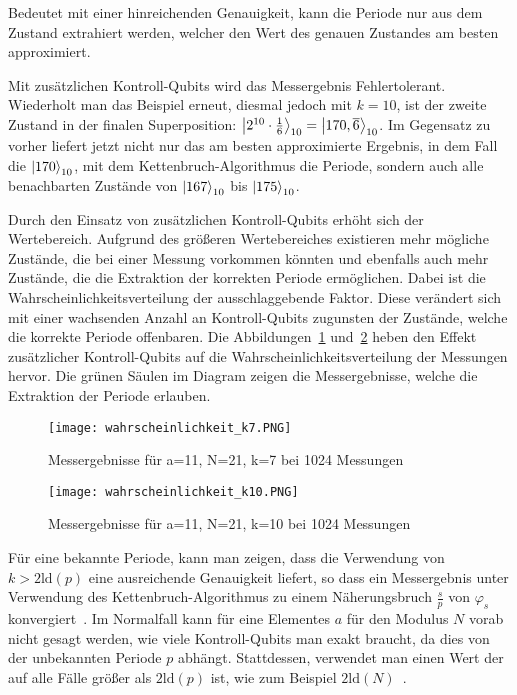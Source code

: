 Bedeutet mit einer hinreichenden Genauigkeit, kann die Periode nur aus dem Zustand extrahiert werden, 
welcher den Wert des genauen Zustandes am besten approximiert.

Mit zusätzlichen Kontroll-Qubits wird das Messergebnis Fehlertolerant.
Wiederholt man das Beispiel erneut, diesmal jedoch mit \(k=10\), 
ist der zweite Zustand in der finalen Superposition: 
\(\ket{2^{10} \cdot \frac{1}{6}}_{10} =\ket{170,\overline{6}}_{10}\).
Im Gegensatz zu vorher liefert jetzt nicht nur das am besten approximierte Ergebnis, 
in dem Fall die \(\ket{170}_{10}\), mit dem Kettenbruch-Algorithmus die Periode, 
sondern auch alle benachbarten Zustände von \(\ket{167}_{10}\) bis \(\ket{175}_{10}\).

Durch den Einsatz von zusätzlichen Kontroll-Qubits erhöht sich der Wertebereich. 
Aufgrund des größeren Wertebereiches existieren mehr mögliche Zustände, 
die bei einer Messung vorkommen könnten und ebenfalls auch mehr Zustände, 
die die Extraktion der korrekten Periode ermöglichen. 
Dabei ist die Wahrscheinlichkeitsverteilung der ausschlaggebende Faktor. 
Diese verändert sich mit einer wachsenden Anzahl an Kontroll-Qubits zugunsten der Zustände, 
welche die korrekte Periode offenbaren.
Die Abbildungen~\ref{fig:Messung7k} und~\ref{fig:Messung10k} 
heben den Effekt zusätzlicher Kontroll-Qubits auf die Wahrscheinlichkeitsverteilung der Messungen hervor.
Die grünen Säulen im Diagram zeigen die Messergebnisse, welche die Extraktion der Periode erlauben.

\begin{figure} [H]
    \caption{Messergebnisse für a=11, N=21, k=7 bei 1024 Messungen}
    \label{fig:Messung7k}
    \texttt{[image: wahrscheinlichkeit\_k7.PNG]}
    \centering
    \end{figure}
\begin{figure} [H]
    \caption{Messergebnisse für a=11, N=21, k=10 bei 1024 Messungen}
    \label{fig:Messung10k}
    \texttt{[image: wahrscheinlichkeit\_k10.PNG]}
    \centering
    \end{figure}

Für eine bekannte Periode, 
kann man zeigen, 
dass die Verwendung von \(k > 2\text{ld}(p)\) eine ausreichende Genauigkeit liefert,
so dass ein Messergebnis unter Verwendung des Kettenbruch-Algorithmus zu einem Näherungsbruch \(\frac{s}{p}\) von \(\varphi_s\) konvergiert~\cite{Shor_1997}.
Im Normalfall kann für eine Elementes \(a\) für den Modulus \(N\) vorab nicht gesagt werden, 
wie viele Kontroll-Qubits man exakt braucht, 
da dies von der unbekannten Periode \(p\) abhängt.
Stattdessen, verwendet man einen Wert der auf alle Fälle größer als \(2\text{ld}(p)\) ist, 
wie zum Beispiel \(2\text{ld}(N)\)~\cite{Shor_1997}\cite{mosca1999hidden}. 


